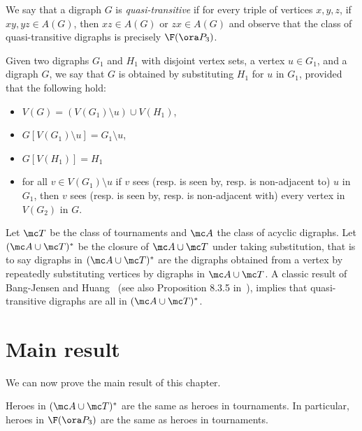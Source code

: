 We say that a digraph $G$ is  \emph{quasi-transitive} if for every triple of vertices $x,y,z$, if $xy,yz \in A(G)$, then $xz \in A(G)$ or $zx \in A(G)$ and observe that the class of quasi-transitive digraphs is precisely $\F( \ora P_3)$. 

Given two digraphs $G_1$ and $H_1$ with disjoint vertex sets, a vertex $u \in G_1$, and a digraph $G$, we say that $G$ is obtained by substituting $H_1$ for $u$ in $G_1$,
provided that the following hold: 
\begin{itemize}
    \item $V(G) = (V(G_1) \setminus u) \cup V(H_1)$,
    \item $G[V(G_1) \setminus u] = G_1 \setminus u$,
    \item $G[V(H_1)] = H_1$
    \item for all $v \in  V(G_1) \setminus u$ if $v$  sees (resp. is seen by, resp. is non-adjacent to)  $u$ in $G_1$, then $v$  sees (resp. is seen by, resp. is non-adjacent with) every vertex in $V(G_2)$ in $G$. 
\end{itemize}
Let $\mc T$ be the class of tournaments and $\mc A$ the class of acyclic  digraphs. Let $(\mc A \cup \mc T)^*$ be the closure of $\mc A \cup \mc T$ under taking substitution, that is to say digraphs in $(\mc A \cup \mc T)^*$ are the digraphs obtained from a vertex by repeatedly substituting vertices by digraphs in $\mc A \cup \mc T$.
A classic result of Bang-Jensen and Huang~\cite{BH95} (see also Proposition 8.3.5 in~\cite{BG18}), implies that quasi-transitive digraphs are all in $(\mc A \cup \mc T)^*$. 

\section{Main result}

We can now prove the main result of this chapter.

\begin{theorem}
Heroes in $(\mc A \cup \mc T)^*$ are the same as heroes in tournaments. In particular, heroes in $\F( \ora P_3)$ are the same as heroes in tournaments. 
\end{theorem}

